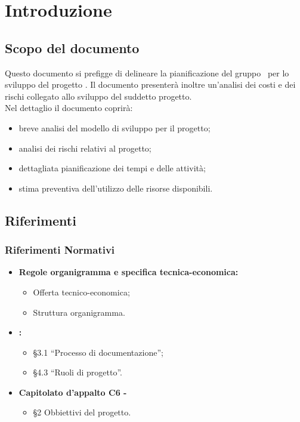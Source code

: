 \documentclass[PianoDiProgetto.tex]{subfiles}
\begin{document}
\chapter{Introduzione}

\section{Scopo del documento}
Questo documento si prefigge di delineare la pianificazione del gruppo \gruppo\ per lo sviluppo del progetto \progetto. Il documento presenterà inoltre un'analisi dei costi e dei rischi collegato allo sviluppo del suddetto progetto.\\
Nel dettaglio il documento coprirà:
\begin{itemize}
	\item breve analisi del modello di sviluppo per il progetto;
	\item analisi dei rischi relativi al progetto;
	\item dettagliata pianificazione dei tempi e delle attività;
	\item stima preventiva dell'utilizzo delle risorse disponibili.
\end{itemize}

\scopoProdotto

\glossExpl
\section{Riferimenti}
\subsection{Riferimenti Normativi}
\begin{itemize}
	\item \textbf{Regole organigramma e specifica tecnica-economica:} \\
		  \begin{itemize}
		  	\item Offerta tecnico-economica;
		  	\item Struttura organigramma.
		  \end{itemize}
	\item \textbf{\normediprogetto \vruno:}
	 \begin{itemize}
	 	\item \S3.1 ``Processo di documentazione'';
	  	\item \S4.3 ``Ruoli di progetto''.
	 \end{itemize}
 	\item \textbf{Capitolato d'appalto C6 - \progetto}\\
 		\begin{itemize}
 			\item \S2 Obbiettivi del progetto.
 		\end{itemize}
	
\end{itemize}
\end{document}
